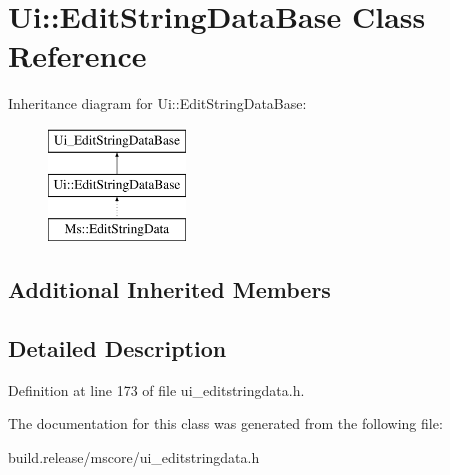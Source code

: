 \hypertarget{class_ui_1_1_edit_string_data_base}{}\section{Ui\+:\+:Edit\+String\+Data\+Base Class Reference}
\label{class_ui_1_1_edit_string_data_base}
Inheritance diagram for Ui\+:\+:Edit\+String\+Data\+Base\+:\begin{figure}[H]
\begin{center}
\leavevmode
\includegraphics[height=3.000000cm]{class_ui_1_1_edit_string_data_base}
\end{center}
\end{figure}
\subsection*{Additional Inherited Members}


\subsection{Detailed Description}


Definition at line 173 of file ui\+\_\+editstringdata.\+h.



The documentation for this class was generated from the following file\+:\begin{DoxyCompactItemize}
\item 
build.\+release/mscore/ui\+\_\+editstringdata.\+h\end{DoxyCompactItemize}
